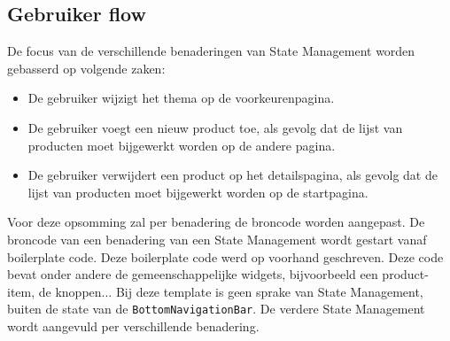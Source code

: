\subsection{Gebruiker flow}
\label{ch:user-flow}
De focus van de verschillende benaderingen van State Management worden gebasserd op volgende zaken: 
\begin{itemize}
    \item De gebruiker wijzigt het thema op de voorkeurenpagina.
    \item De gebruiker voegt een nieuw product toe, als gevolg dat de lijst van producten moet bijgewerkt worden op de andere pagina.
    \item De gebruiker verwijdert een product op het detailspagina, als gevolg dat de lijst van producten moet bijgewerkt worden op de startpagina.
\end{itemize}
Voor deze opsomming zal per benadering de broncode worden aangepast. De broncode van een benadering van een State Management wordt gestart vanaf boilerplate code. Deze boilerplate code werd op voorhand geschreven. Deze code bevat onder andere de gemeenschappelijke widgets, bijvoorbeeld een product-item, de knoppen...
Bij deze template is geen sprake van State Management, buiten de state van de \verb|BottomNavigationBar|. De verdere State Management wordt aangevuld per verschillende benadering.

